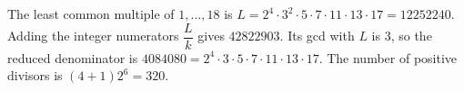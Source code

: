 The least common multiple of $1,\ldots,18$ is $L=2^4\cdot3^2\cdot5\cdot7\cdot11\cdot13\cdot17=12252240$. Adding the integer numerators $\dfrac{L}{k}$ gives $42822903$. Its gcd with $L$ is $3$, so the reduced denominator is $4084080=2^4\cdot3\cdot5\cdot7\cdot11\cdot13\cdot17$. The number of positive divisors is $(4+1)2^6=\boxed{320}$.
